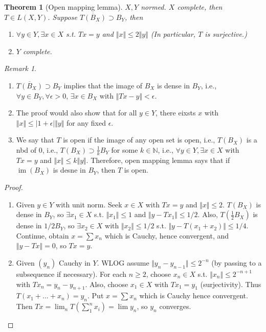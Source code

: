 \documentclass{article}
\theoremstyle{definition}
\theoremstyle{remark}
\newtheorem{rem}{Remark}
\theoremstyle{plain}
\newtheorem{thm}[defn]{Theorem}
\newcommand{\NN}{\mathbb{N}}
\begin{document}
\begin{thm}[Open mapping lemma]
    $X,Y$ normed. $X$ complete, then $T\in L(X,Y)$. Suppose $\overline{T(B_X)}\supset B_Y$, then
    \begin{enumerate}
        \item $\forall y\in Y,\exists x\in X$ s.t. $Tx=y$ and $\Vert x\Vert\le 2\Vert y\Vert$ (In particular, $T$ is surjective.)
        \item $Y$ complete.
    \end{enumerate}
\end{thm}
\begin{rem}
    \begin{enumerate}
        \item $\overline{T(B_X)}\supset B_Y$ implies that the image of $B_X$ is dense in $B_Y$, i.e., $\forall y\in B_Y,\forall\epsilon>0$, $\exists x\in B_X$ with $\Vert Tx-y\Vert<\epsilon$.
        \item The proof would also show that for all $y\in Y$, there eixsts $x$ with $\Vert x\Vert\le|1+\epsilon|\Vert y\Vert$ for any fixed $\epsilon$.
        \item We say that $T$ is open if the image of any open set is open, i.e., $T(B_X)$ is a nbd of $0$, i.e., $T(B_X)\supset\frac{1}{k}B_Y$ for some $k\in\NN$, i.e., $\forall y\in Y,\exists x\in X$ with $Tx=y$ and $\Vert x\Vert\le k\Vert y\Vert$. Therefore, open mapping lemma says that if $\operatorname{im}(B_X)$ is desne in $B_Y$, then $T$ is open.
    \end{enumerate}
\end{rem}
\begin{proof}
    \begin{enumerate}
        \item Given $y\in Y$ with unit norm. Seek $x\in X$ with $Tx=y$ and $\Vert x\Vert\le 2$. $T(B_X)$ is dense in $B_Y$, so $\exists x_1\in X$ s.t. $\Vert x_1\Vert\le1$ and $\Vert y-Tx_1\Vert\le 1/2$. Also, $T(\frac{1}{2}B_X)$ is dense in $1/2B_Y$, so $\exists x_2\in X$ with $\Vert x_2\Vert\le 1/2$ s.t. $\Vert y-T(x_1+x_2)\Vert\le 1/4$. Continue, obtain $x=\sum x_n$ which is Cauchy, hence convergent, and $\Vert y-Tx\Vert=0$, so $Tx=y$.
        \item Given $(y_n)$ Cauchy in $Y$. WLOG assume $\Vert y_n-y_{n-1}\Vert\le 2^{-n}$ (by passing to a subsequence if necessary). For each $n\ge 2$, choose $x_n\in X$ s.t. $\Vert x_n\Vert\le 2^{-n+1}$ with $Tx_n=y_n-y_{n+1}$. Also, choose $x_1\in X$ with $Tx_1=y_1$ (surjectivity). Thus $T(x_1+...+x_n)=y_n$. Put $x=\sum x_n$ which is Cauchy hence convergent. Then $Tx=\lim_n T(\sum_1^n x_i)=\lim y_n$, so $y_n$ converges. 
    \end{enumerate}
\end{proof}
\end{document}
